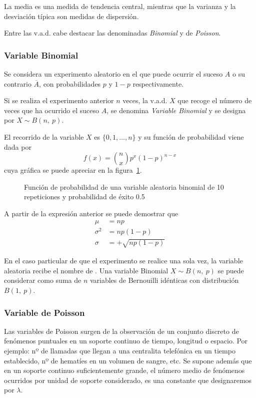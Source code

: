 La media es una medida de tendencia central, mientras que la
varianza y la desviación típica son medidas de dispersión.

Entre las v.a.d. cabe destacar las denominadas \emph{Binomial} y de \emph{Poisson}.

\subsubsection{Variable Binomial}

Se considera un experimento aleatorio en el que puede ocurrir el suceso $A$ o su contrario $\overline{A}$,
con probabilidades $p$ y $1-p$ respectivamente.

Si se realiza el experimento anterior $n$ veces, la v.a.d. $X$ que
recoge el número de veces que ha ocurrido el suceso $A$, se denomina
\emph{Variable Binomial} y se designa por $X\sim B(n,\ p)$.

El recorrido de la variable $X$ es $\{0,1,...,n\}$ y su función de
probabilidad viene dada por
\[
f(x)= \binom{n}{x} p^x  \left( {1 - p} \right)^{n - x}
\]
cuya gráfica se puede apreciar en la figura~\ref{g:binomial}.

\begin{figure}[h!]
  \centering
  \scalebox{0.8}{} 
  \caption{Función de probabilidad de una variable aleatoria binomial de 10 repeticiones y probabilidad de éxito 0.5}\label{g:binomial}
\end{figure}

A partir de la expresión anterior se puede demostrar que
\begin{align*}
\mu  &= n p\\
\sigma ^2  &= n p (1 - p)\\
\sigma  &=  + \sqrt {n p (1 - p)}
\end{align*}

En el caso particular de que el experimento se realice una sola vez,
la variable aleatoria recibe el nombre de . Una variable Binomial $X\sim B(n,\ p)$ se puede
considerar como suma de $n$ variables de Bernouilli idénticas con
distribución $B(1,\ p)$.

\subsubsection{Variable de Poisson}

Las variables de Poisson surgen de la observación de un conjunto discreto de fenómenos puntuales en un soporte continuo de tiempo, longitud o espacio. Por ejemplo: nº de llamadas que llegan a una centralita telefónica en un tiempo establecido, nº de hematíes en un volumen de sangre, etc. Se supone además que en un soporte continuo suficientemente grande, el número medio de fenómenos ocurridos por unidad de soporte considerado, es una constante que designaremos por $\lambda$.

